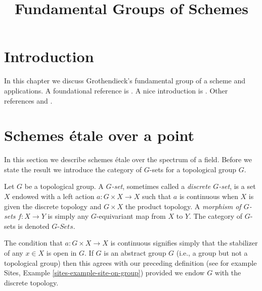 

%


\title{Fundamental Groups of Schemes}


\maketitle

\label{section-phantom}

\tableofcontents

\section{Introduction}
\label{section-introduction}

\noindent
In this chapter we discuss Grothendieck's fundamental group of a scheme
and applications. A foundational reference is \cite{SGA1}.
A nice introduction is \cite{Lenstra}.
Other references \cite{Murre-lectures} and \cite{Grothendieck-Murre}.










\section{Schemes \'etale over a point}
\label{section-schemes-etale-point}

\noindent
In this section we describe schemes \'etale over the spectrum of a field.
Before we state the result we introduce the category of $G$-sets for a
topological group $G$.

\begin{definition}
\label{definition-G-set-continuous}
Let $G$ be a topological group.
A {\it $G$-set}, sometimes called a {\it discrete $G$-set},
is a set $X$ endowed with a left action $a : G \times X \to X$
such that $a$ is continuous when $X$ is given the discrete topology and
$G \times X$ the product topology.
A {\it morphism of $G$-sets} $f : X \to Y$ is simply any $G$-equivariant
map from $X$ to $Y$.
The category of $G$-sets is denoted {\it $G\textit{-Sets}$}.
\end{definition}

\noindent
The condition that $a : G \times X \to X$ is continuous signifies
simply that the stabilizer of any  $x \in X$ is open in $G$.
If $G$ is an abstract group $G$ (i.e., a group but not a topological group)
then this agrees with our preceding definition (see for example
Sites, Example \ref{sites-example-site-on-group})
provided we endow $G$ with the discrete topology.

